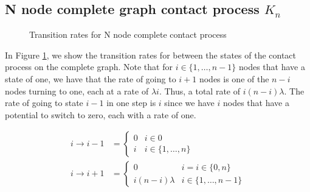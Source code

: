 \subsection{N node complete graph contact process \texorpdfstring{$K_n$}{Kn}}

\begin{figure}[H]
    \centering
    \caption{Transition rates for N node complete contact process}
    \label{fig:complete_contact_n_node_rates}
\end{figure}

In Figure \ref{fig:complete_contact_n_node_rates}, we show the transition rates for between the states of the contact process on the complete graph.
Note that for $i \in \{1,\ldots, n - 1\} $ nodes that have a state of one, we have that the rate of going to $i + 1$ nodes is one of the $n - i$ nodes turning to one, each at a rate of $\lambda i$.
Thus, a total rate of $i (n - i) \lambda$.
The rate of going to state $i - 1$ in one step is $i$ since we have $i$ nodes that have a potential to switch to zero, each with a rate of one.

\begin{align*}
    i \to i - 1 &= \begin{cases}
        0 & i \in 0\\
        i & i \in \{1,\ldots, n\}
    \end{cases}\\
    i \to i + 1 &= \begin{cases}
        0 & i = i \in \{0, n\}\\
        i(n - i) \lambda & i \in \{1,\ldots, n-1\}
    \end{cases}
\end{align*}

